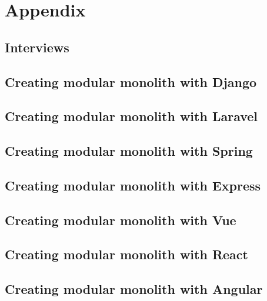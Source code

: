 \chapter{Appendix}

\section{Interviews}


\section{Creating modular monolith with Django}
\label{sec:DjangoImpl}


\section{Creating modular monolith with Laravel}
\label{sec:LaravelImpl}


\section{Creating modular monolith with Spring}
\label{sec:SpringImpl}



\section{Creating modular monolith with Express}
\label{sec:ExpressImpl}


\section{Creating modular monolith with Vue}
\label{sec:VueImpl}


\section{Creating modular monolith with React}
\label{sec:ReactImpl}


\section{Creating modular monolith with Angular}
\label{sec:AngularImpl}

